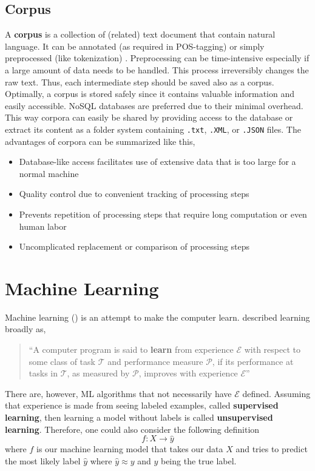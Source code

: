 \subsection{Corpus}
A \textbf{corpus} is a collection of (related) text document that contain natural language. It can be annotated (as required in POS-tagging) or simply preprocessed (like tokenization) \citep{Bengfort2018}.
Preprocessing can be time-intensive especially if a large amount of data needs to be handled. This process irreversibly changes the raw text. Thus, each intermediate step should be saved also as a corpus.
Optimally, a corpus is stored safely since it contains valuable information and easily accessible. NoSQL databases are preferred due to their minimal overhead.
This way corpora can easily be shared by providing access to the database or extract its content as a folder system containing \texttt{.txt}, \texttt{.XML}, or \texttt{.JSON} files.
The advantages of corpora can be summarized like this,
\begin{itemize}
  \item Database-like access facilitates use of extensive data that is too large for a normal machine
  \item Quality control due to convenient tracking of processing steps
  \item Prevents repetition of processing steps that require long computation or even human labor
  \item Uncomplicated replacement or comparison of processing steps
\end{itemize}


\section{Machine Learning}
Machine learning () is an attempt to make the computer learn. \citeauthor{Mitchell1997} described learning broadly as,
%
\begin{quote}
``A computer program is said to \textbf{learn} from experience $\mathcal{E}$ with respect to some class of task $\mathcal{T}$ and performance measure $\mathcal{P}$, if its performance at tasks in $\mathcal{T}$, as measured by $\mathcal{P}$, improves with experience $\mathcal{E}$''
\end{quote}
%
There are, however, ML algorithms that not necessarily have $\mathcal{E}$ defined. Assuming that experience is made from seeing labeled examples, called \textbf{supervised learning}, then learning a model without labels is called \textbf{unsupervised learning}. Therefore, one could also consider the following definition  \[f: X \rightarrow \hat{y}\] where $f$ is our machine learning model that takes our data $X$ and tries to predict the most likely label $\hat{y}$ where $\hat{y} \approx y$ and $y$ being the true label.

